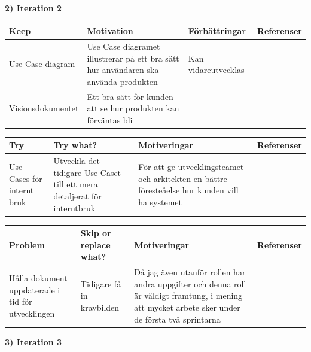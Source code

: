 \documentclass[conference,a4paper]{IEEEtran}
\newcommand\Tstrut{\rule{0pt}{2.6ex}}       %
\newcommand\Bstrut{\rule[-0.9ex]{0pt}{0pt}} %
\newcommand{\TBstrut}{\Tstrut\Bstrut} %
\begin{document}
\textbf{2) Iteration 2}

\begin{table}[H]
	\small
  \centering
	\begin{tabular}{|p{1.5cm}|p{2cm}|p{1.8cm}|p{1.5cm}|} %
    \hline
    Keep & Motivation & Förbättringar & Referenser \TBstrut \\
    \hline
   Use Case diagram & Use Case diagramet illustrerar på ett bra sätt hur användaren ska använda produkten & Kan vidareutvecklas & \cite{Jacobson11} \TBstrut \\
    \hline
    Visionsdokumentet & Ett bra sätt för kunden att se hur produkten kan förväntas bli &  & \cite{Sommerville10} \TBstrut \\
    \hline
  \end{tabular}
\end{table}

\begin{table}[H]
	\small
  \centering
	\begin{tabular}{|p{1.5cm}|p{2cm}|p{1.8cm}|p{1.5cm}|} %
    \hline
    Try & Try what? & Motiveringar & Referenser \TBstrut \\
    \hline
    Use-Cases för internt bruk & Utveckla det tidigare Use-Caset till ett mera detaljerat för interntbruk & För att ge utvecklingsteamet och arkitekten en bättre föresteåelse hur kunden vill ha systemet & \TBstrut \\
    \hline
  \end{tabular}
\end{table}

\begin{table}[H]
	\small
  \centering
	\begin{tabular}{|p{1.5cm}|p{2cm}|p{1.8cm}|p{1.5cm}|} %
    \hline
    Problem & Skip or replace what? & Motiveringar & Referenser \TBstrut \\
    \hline
    Hålla dokument uppdaterade i tid för utvecklingen & Tidigare få in kravbilden & Då jag även utanför rollen har andra uppgifter och denna roll är väldigt framtung, i mening att mycket arbete sker under de första två sprintarna  &  \TBstrut \\
    \hline

  \end{tabular}
\end{table}

\textbf{3) Iteration 3}
\end{document}
